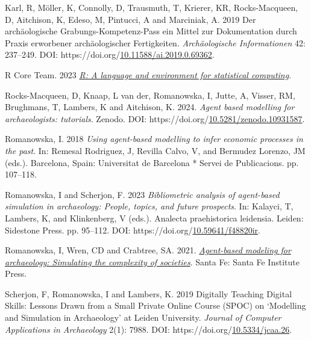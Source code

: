 \documentclass[
]{article}
\newlength{\cslhangindent}
\newlength{\cslentryspacingunit} %
\newenvironment{CSLReferences}[2] %
 {%
  \setlength{\parindent}{0pt}
  \ifodd #1
  \let\oldpar\par
  \def\par{\hangindent=\cslhangindent\oldpar}
  \fi
  \setlength{\parskip}{#2\cslentryspacingunit}
 }%
 {}
\begin{document}
\begin{CSLReferences}{1}{0}
\leavevmode{}%
Karl, R, Möller, K, Connolly, D, Trausmuth, T, Krierer, KR, Rocks-Macqueen, D, Aitchison, K, Edeso, M, Pintucci, A and Marciniak, A. 2019 Der archäologische Grabungs-Kompetenz-Pass {\textendash} ein Mittel zur Dokumentation durch Praxis erworbener archäologischer Fertigkeiten. \emph{Archäologische Informationen} 42: 237--249. DOI: https://doi.org/\href{https://doi.org/10.11588/ai.2019.0.69362}{10.11588/ai.2019.0.69362}.

\leavevmode{}%
R Core Team. 2023 \emph{\href{https://www.R-project.org/}{R: A language and environment for statistical computing}}.

\leavevmode{}%
Rocks-Macqueen, D, Knaap, L van der, Romanowska, I, Jutte, A, Visser, RM, Brughmans, T, Lambers, K and Aitchison, K. 2024. \emph{Agent based modelling for archaeologists: tutorials}. Zenodo. DOI: https://doi.org/\href{https://doi.org/10.5281/zenodo.10931587}{10.5281/zenodo.10931587}.

\leavevmode{}%
Romanowska, I. 2018 \emph{Using agent-based modelling to infer economic processes in the past}. In: Remesal Rodriguez, J, Revilla Calvo, V, and Bermudez Lorenzo, JM (eds.). Barcelona, Spain: Universitat de Barcelona * Servei de Publicacions. pp. 107--118.

\leavevmode{}%
Romanowska, I and Scherjon, F. 2023 \emph{Bibliometric analysis of agent-based simulation in archaeology: People, topics, and future prospects}. In: Kalayci, T, Lambers, K, and Klinkenberg, V (eds.). Analecta praehistorica leidensia. Leiden: Sidestone Press. pp. 95--112. DOI: https://doi.org/\href{https://doi.org/10.59641/f48820ir}{10.59641/f48820ir}.

\leavevmode{}%
Romanowska, I, Wren, CD and Crabtree, SA. 2021. \emph{\href{https://www.sfipress.org/books/agent-based-modeling-archaeology}{Agent-based modeling for archaeology: Simulating the complexity of societies}}. Santa Fe: Santa Fe Institute Press.

\leavevmode{}%
Scherjon, F, Romanowska, I and Lambers, K. 2019 Digitally Teaching Digital Skills: Lessons Drawn from a Small Private Online Course (SPOC) on {`}Modelling and Simulation in Archaeology{'} at Leiden University. \emph{Journal of Computer Applications in Archaeology} 2(1): 7988. DOI: https://doi.org/\href{https://doi.org/10.5334/jcaa.26}{10.5334/jcaa.26}.


\end{CSLReferences}
\end{document}
